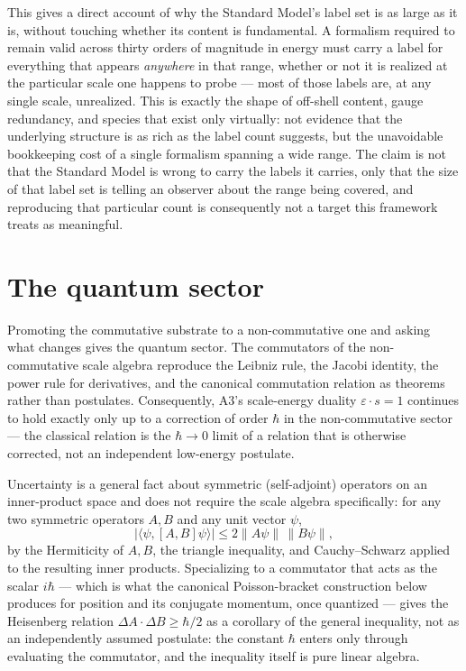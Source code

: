 \documentclass[aps,prd,twocolumn,superscriptaddress,nofootinbib]{revtex4-2}
\begin{document}
This gives a direct account of why the Standard Model's label set is as
large as it is, without touching whether its content is fundamental. A
formalism required to remain valid across thirty orders of magnitude in
energy must carry a label for everything that appears \emph{anywhere} in
that range, whether or not it is realized at the particular scale one
happens to probe — most of those labels are, at any single scale,
unrealized. This is exactly the shape of off-shell content, gauge
redundancy, and species that exist only virtually: not evidence that the
underlying structure is as rich as the label count suggests, but the
unavoidable bookkeeping cost of a single formalism spanning a wide
range. The claim is not that the Standard Model is wrong to carry the
labels it carries, only that the size of that label set is telling an
observer about the range being covered, and reproducing that particular
count is consequently not a target this framework treats as meaningful.

\section{The quantum sector}\label{sec:quantum}

Promoting the commutative substrate to a non-commutative one and asking
what changes gives the quantum sector. The commutators of the
non-commutative scale algebra reproduce the Leibniz rule, the Jacobi
identity, the power rule for derivatives, and the canonical commutation
relation as theorems rather than postulates. Consequently, A3's scale-energy
duality $\varepsilon\cdot s=1$ continues to hold exactly only up to a
correction of order $\hbar$ in the non-commutative sector — the classical
relation is the $\hbar\to0$ limit of a relation that is otherwise
corrected, not an independent low-energy postulate.

Uncertainty is a general fact about symmetric (self-adjoint) operators on
an inner-product space and does not require the scale algebra
specifically: for any two symmetric operators $A,B$ and any unit vector
$\psi$,
\begin{equation}
|\langle\psi,[A,B]\psi\rangle| \le 2\|A\psi\|\,\|B\psi\|,
\end{equation}
by the Hermiticity of $A,B$, the triangle inequality, and Cauchy–Schwarz
applied to the resulting inner products. Specializing to a commutator
that acts as the scalar $i\hbar$ — which is what the canonical
Poisson-bracket construction below produces for position and its
conjugate momentum, once quantized — gives the Heisenberg relation
$\Delta A\cdot\Delta B \ge \hbar/2$ as a corollary of the general
inequality, not as an independently assumed postulate: the constant
$\hbar$ enters only through evaluating the commutator, and the
inequality itself is pure linear algebra.
\end{document}
